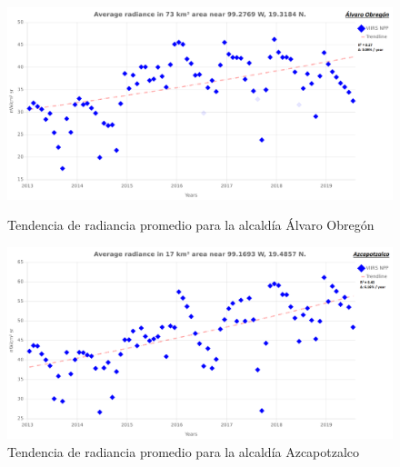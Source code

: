 \begin{figure}[H]
  \centering
    \includegraphics[width=1\textwidth]{AO}
  \caption{Tendencia de radiancia promedio para la alcaldía Álvaro Obregón}
  \label{radiancetrendsao}
\vspace{20mm} 
    \includegraphics[width=1\textwidth]{AZ}
  \caption{Tendencia de radiancia promedio para la alcaldía Azcapotzalco}
  \label{radiancetrendsaz}
\end{figure}
\blindtext

\newpage

